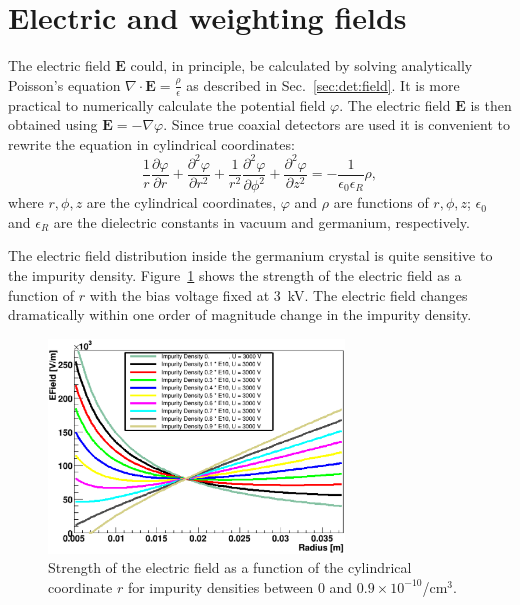 \section{Electric and weighting fields}
\label{sec:pss:field}
The electric field $\mathbf{E}$ could, in principle, be calculated by solving analytically Poisson's equation $\nabla \cdot \mathbf{E} = \frac{\rho}{\epsilon}$ as described in Sec.~\ref{sec:det:field}. It is more practical to numerically calculate the potential field $\varphi$. The electric field $\mathbf{E}$ is then obtained using $\mathbf{E} = - \nabla \varphi$. Since true coaxial detectors are used it is convenient to rewrite the equation in cylindrical coordinates:
\begin{equation}
\frac{1}{r} \frac{\partial \varphi}{\partial r} + \frac{\partial^{2} \varphi}{\partial r^{2}} + \frac{1}{r^{2}} \frac{\partial^{2} \varphi}{\partial \phi^{2}} +
\frac{\partial^{2} \varphi}{\partial z^{2}} = - \frac{1}{\epsilon_{0}
\epsilon_{R}} \rho,
\label{eq:pss:pocyl}
\end{equation}
where $r, \phi, z$ are the cylindrical coordinates, $\varphi$ and $\rho$ are functions of $r, \phi, z$; $\epsilon_{0}$ and $\epsilon_{R}$ are the dielectric constants in vacuum and germanium, respectively.

The electric field distribution inside the germanium crystal is quite sensitive to the impurity density. Figure~\ref{fig:pss:rho} shows the strength of the electric field as a function of $r$ with the bias voltage fixed at 3~kV. The electric field changes dramatically within one order of magnitude change in the impurity density.

\begin{figure}[htbp]
\centering
\includegraphics[width=0.7\textwidth]{rho}
\caption{Strength of the electric field as a function of the cylindrical coordinate $r$ for impurity densities between 0 and $0.9 \times 10^{-10}$/cm$^{3}$.}
\label{fig:pss:rho}
\end{figure}

